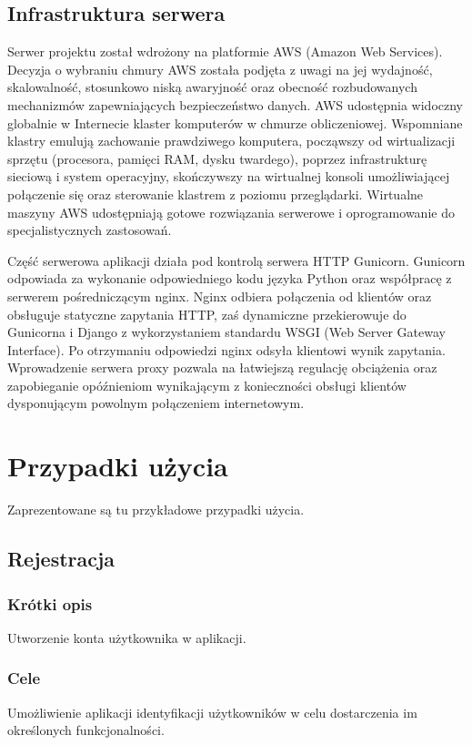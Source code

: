 \documentclass[licencjacka]{pracamgr}
\begin{document}
\section{Infrastruktura serwera} 

Serwer projektu został wdrożony na platformie AWS (Amazon Web Services). Decyzja o wybraniu chmury AWS została podjęta z uwagi na jej wydajność, skalowalność, stosunkowo niską awaryjność oraz obecność rozbudowanych mechanizmów zapewniających bezpieczeństwo danych. AWS udostępnia widoczny globalnie w Internecie klaster komputerów w chmurze obliczeniowej. Wspomniane klastry emulują zachowanie prawdziwego komputera, począwszy od wirtualizacji sprzętu (procesora, pamięci RAM, dysku twardego), poprzez infrastrukturę sieciową i system operacyjny, skończywszy na wirtualnej konsoli umożliwiającej połączenie się oraz sterowanie klastrem z poziomu przeglądarki. Wirtualne maszyny AWS udostępniają gotowe rozwiązania serwerowe i oprogramowanie do specjalistycznych zastosowań.

Część serwerowa aplikacji działa pod kontrolą serwera HTTP Gunicorn. Gunicorn odpowiada za wykonanie odpowiedniego kodu języka Python oraz współpracę z serwerem pośredniczącym nginx. Nginx odbiera połączenia od klientów oraz obsługuje statyczne zapytania HTTP, zaś dynamiczne przekierowuje do Gunicorna i Django z wykorzystaniem standardu WSGI (Web Server Gateway Interface). Po otrzymaniu odpowiedzi nginx odsyła klientowi wynik zapytania. Wprowadzenie serwera proxy pozwala na łatwiejszą regulację obciążenia oraz zapobieganie opóźnieniom wynikającym z konieczności obsługi klientów dysponującym powolnym połączeniem internetowym.

\chapter{Przypadki użycia}\label{r:usecase}
Zaprezentowane są tu przykładowe przypadki użycia.
\section{Rejestracja}
    \subsection{Krótki opis}
    Utworzenie konta użytkownika w aplikacji.
    \subsection{Cele}
    Umożliwienie aplikacji identyfikacji użytkowników w celu dostarczenia im określonych funkcjonalności.
\end{document}

